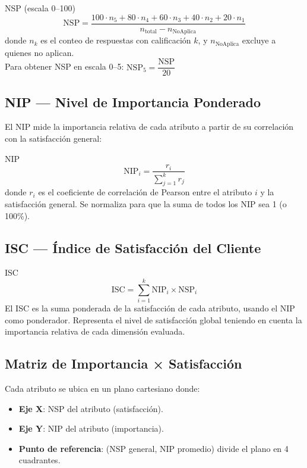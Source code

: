 \documentclass[12pt, letterpaper]{article}
\begin{document}
\begin{formulabox}{NSP (escala 0–100)}
\[
\text{NSP} = \frac{100 \cdot n_5 + 80 \cdot n_4 + 60 \cdot n_3 + 40 \cdot n_2 + 20 \cdot n_1}{n_{\text{total}} - n_{\text{NoAplica}}}
\]
donde $n_k$ es el conteo de respuestas con calificación $k$, y $n_{\text{NoAplica}}$ excluye a quienes no aplican.\\[4pt]
Para obtener NSP en escala 0--5: $\text{NSP}_5 = \dfrac{\text{NSP}}{20}$
\end{formulabox}

\subsection{NIP — Nivel de Importancia Ponderado}

El NIP mide la importancia relativa de cada atributo a partir de su correlación con la satisfacción general:

\begin{formulabox}{NIP}
\[
\text{NIP}_i = \frac{r_i}{\sum_{j=1}^{k} r_j}
\]
donde $r_i$ es el coeficiente de correlación de Pearson entre el atributo $i$ y la satisfacción general. Se normaliza para que la suma de todos los NIP sea 1 (o 100\%).
\end{formulabox}

\subsection{ISC — Índice de Satisfacción del Cliente}

\begin{formulabox}{ISC}
\[
\text{ISC} = \sum_{i=1}^{k} \text{NIP}_i \times \text{NSP}_i
\]
El ISC es la suma ponderada de la satisfacción de cada atributo, usando el NIP como ponderador. Representa el nivel de satisfacción global teniendo en cuenta la importancia relativa de cada dimensión evaluada.
\end{formulabox}

\subsection{Matriz de Importancia × Satisfacción}

Cada atributo se ubica en un plano cartesiano donde:
\begin{itemize}
  \item \textbf{Eje X}: NSP del atributo (satisfacción).
  \item \textbf{Eje Y}: NIP del atributo (importancia).
  \item \textbf{Punto de referencia}: (NSP general, NIP promedio) divide el plano en 4 cuadrantes.
\end{itemize}
\end{document}
